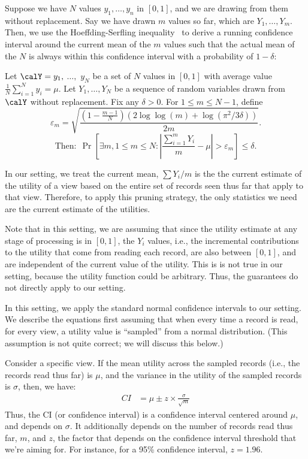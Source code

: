 Suppose we have $N$ values $y_1, \ldots, y_n$ in $[0, 1]$, and we are drawing
from them without replacement. 
Say we have drawn $m$ values so far, which are $Y_1, \ldots, Y_m$.
Then, we use the Hoeffding-Serfling inequality~\cite{serfling1974probability} 
to derive a running 
confidence interval around the current mean 
of the $m$ values such that the actual mean of the $N$
is always within this confidence interval with a probability of $1 - \delta$:
\begin{theorem}
\label{thm:hs}
Let $\calY = y_1,$ $\ldots,$ $y_N$ be a set of $N$ 
values in $[0,1]$ with average value
$\frac1N \sum_{i=1}^N y_i = \mu$.
Let $Y_1,\ldots,Y_N$ be a 
sequence of random variables drawn from $\calY$ without
replacement.
Fix any $\delta > 0$. For $1 \le m \le N-1$, define
$$
\varepsilon_m = \sqrt{\frac{(1-\frac{m-1}N)(2\log \log (m) + \log(\pi^2/3\delta))}{2m}}.
$$
$$
\textrm{Then:} \ \   \Pr\left[ \exists m, 1 \le m \le N : 
  \left|\frac{\sum_{i=1}^m Y_i}{m} - \mu\right| > \varepsilon_m \right] 
\le \delta.
$$
\end{theorem}
In our setting, we treat the current mean, $\sum Y_i / m$ is the 
the current estimate of the utility of a view 
based on the entire set of records seen thus far that apply to that view. 
Therefore, to apply this pruning strategy, the only statistics
we need are the current estimate of the utilities.

Note that in this setting, we are assuming that since the
utility estimate at any stage of processing is in $[0, 1]$, 
the $Y_i$ values, i.e., the incremental contributions to the utility
that come from reading each record, are also between $[0, 1]$,
and are independent of the current value of the utility. 
This is is not true in our setting, 
because the utility function could be arbitrary.
Thus, the guarantees do not directly apply to our setting. 

 In this setting,
we apply the standard normal confidence intervals to our setting. 
We describe the equations first assuming that
when every time a record is read, for every view,
a utility value is ``sampled''
from a normal distribution. (This assumption is not
quite correct; we will discuss this  below.)

Consider a specific view. 
If the mean utility across the sampled records 
(i.e., the records read thus far) is $\mu$,
and the variance in the utility of the sampled records
is $\sigma$, then, we have:
\begin{align}
CI & = \mu \pm z \times \frac{\sigma}{\sqrt{m}}
\end{align}
Thus, the CI (or confidence interval) is 
a confidence interval centered around $\mu$, 
and depends on $\sigma$. 
It additionally depends on the number of records
read thus far, $m$,
and $z$, the factor that depends on the confidence interval
threshold that we're aiming for.
For instance, for a 95\% confidence interval, $z = 1.96$.

